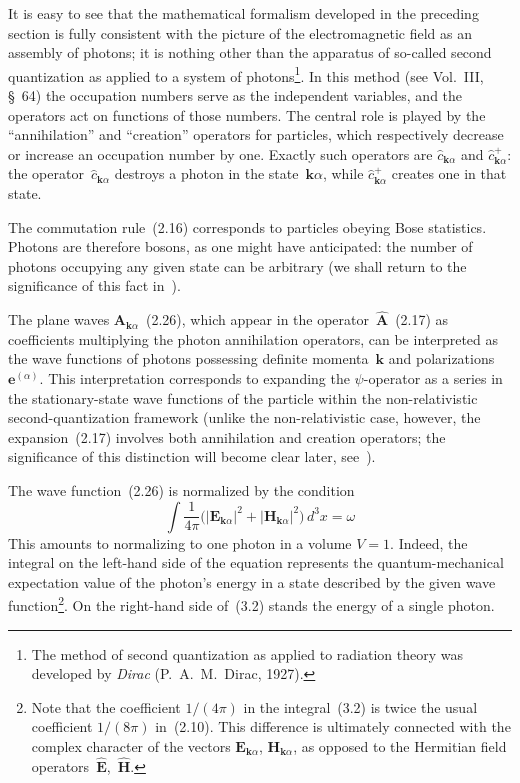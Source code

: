 It is easy to see that the mathematical formalism developed in the preceding section is fully consistent with the picture of the electromagnetic field as an assembly of photons; it is nothing other than the apparatus of so-called second quantization as applied to a system of photons\footnote{The method of second quantization as applied to radiation theory was developed by \emph{Dirac} (P.~A.~M.~Dirac, 1927).}. In this method (see Vol.~III, \S~64) the occupation numbers serve as the independent variables, and the operators act on functions of those numbers. The central role is played by the ``annihilation'' and ``creation''
operators for particles, which respectively decrease or increase an occupation number by one. Exactly such operators are $\hat{c}_{\mathbf{k}\alpha}$ and $\hat{c}^+_{\mathbf{k}\alpha}$: the operator~$\hat{c}_{\mathbf{k}\alpha}$ destroys a photon in the state~$\mathbf{k}\alpha$, while $\hat{c}^+_{\mathbf{k}\alpha}$ creates one in that state.

The commutation rule~(2.16) corresponds to particles obeying Bose statistics. Photons are therefore bosons, as one might have anticipated: the number of photons occupying any given state can be arbitrary (we shall return to the significance of this fact in~).

The plane waves $\mathbf{A}_{\mathbf{k}\alpha}$~(2.26), which appear in the operator~$\hat{\mathbf{A}}$~(2.17) as coefficients multiplying the photon annihilation operators, can be interpreted as the wave functions of photons possessing definite momenta~$\mathbf{k}$ and polarizations~$\mathbf{e}^{(\alpha)}$. This interpretation corresponds to expanding the $\psi$-operator as a series in the stationary-state wave functions of the particle within the non-relativistic second-quantization framework (unlike the non-relativistic case, however, the expansion~(2.17) involves both annihilation and creation operators; the significance of this distinction will become clear later, see~).

The wave function~(2.26) is normalized by the condition
\begin{equation}
\int \frac{1}{4\pi}\bigl(|\mathbf{E}_{\mathbf{k}\alpha}|^2 + |\mathbf{H}_{\mathbf{k}\alpha}|^2\bigr)\,d^3x = \omega
\tag{3.2}
\end{equation}
This amounts to normalizing to one photon in a volume $V = 1$. Indeed, the integral on the left-hand side of the equation represents the quantum-mechanical expectation value of the photon's energy in a state described by the given wave function\footnote{Note that the coefficient $1/(4\pi)$ in the integral~(3.2) is twice the usual coefficient $1/(8\pi)$ in~(2.10). This difference is ultimately connected with the complex character of the vectors $\mathbf{E}_{\mathbf{k}\alpha}$, $\mathbf{H}_{\mathbf{k}\alpha}$, as opposed to the Hermitian field operators~$\hat{\mathbf{E}}$,~$\hat{\mathbf{H}}$.}. On the right-hand side of~(3.2) stands the energy of a single photon.

